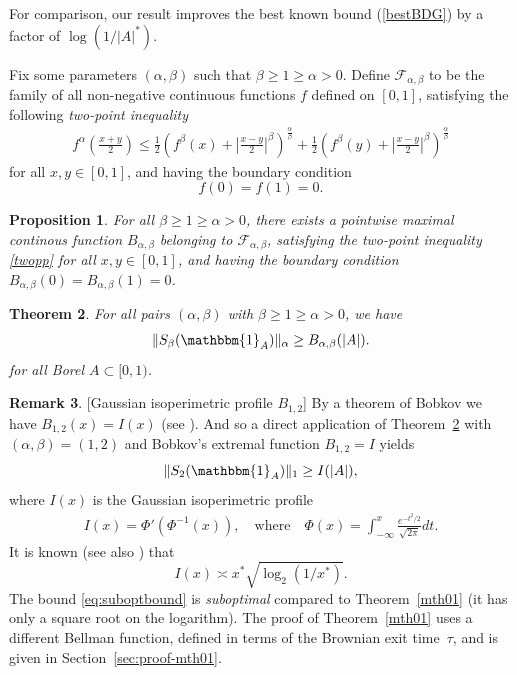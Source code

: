 \documentclass[11pt]{amsart}
\newtheorem{theorem}{Theorem}[section]
\newtheorem{proposition}[theorem]{Proposition}
\theoremstyle{definition}
\newtheorem{remark}[theorem]{Remark}
\renewcommand{\1}{{\mathbbm{1}}}
\begin{document}
For comparison, our result improves the best known bound (\ref{bestBDG}) by a factor of $\log(1/|A|^*)$. 

\vskip0.5cm 

Fix some parameters $(\alpha, \beta)$ such that $\beta \geq 1 \geq \alpha >0$. Define $\mathcal{F}_{\alpha,\beta}$ to be the family of all non-negative continuous functions $f$ defined on $[0,1]$, satisfying the following {\em two-point inequality} 
\begin{align}\label{twopp}
f^{\alpha}\left(\frac{x+y}{2}\right) \leq \frac{1}{2} \left(f^{\beta}(x)+\left|\frac{x-y}{2}\right|^{\beta}\right)^{\frac{\alpha}{\beta}}+\frac{1}{2} \left(f^{\beta}(y)+\left|\frac{x-y}{2}\right|^{\beta}\right)^{\frac{\alpha}{\beta}}
\end{align}
for all $x,y \in [0,1]$, and having the boundary condition
$$
f(0)=f(1)=0.
$$

\begin{proposition}\label{twopp-max-func}
For all $\beta \geq 1 \geq \alpha >0$, there exists a pointwise maximal {continous} function $ B_{\alpha, \beta}$ belonging to $\mathcal{F}_{\alpha,\beta}$, satisfying
the {\em two-point inequality} \eqref{twopp}
for all $x,y \in [0,1]$, and having the boundary condition  $B_{\alpha, \beta}(0)=B_{\alpha, \beta}(1)=0$.
\end{proposition}

\begin{theorem} \label{mthgenab}
For all pairs $(\alpha, \beta)$ with $\beta \geq 1\geq \alpha >0$, we have
\begin{align}\label{genab}
\| S_{\beta}(\mathbbm{1}_{A})\|_{\alpha} \geq B_{\alpha,\beta}(|A|). 
\end{align}
for all Borel $A \subset {[0,1)}$.
\end{theorem}

\begin{remark}\label{remb1}[Gaussian isoperimetric profile $B_{1,2}$]
By a theorem of Bobkov we have $B_{1,2}(x)=I(x)$ (see \cite{bobk1}). 
And so a direct application of Theorem~\ref{mthgenab} with $(\alpha,\beta)=(1,2)$ and Bobkov's extremal function $B_{1,2}=I$ yields
\begin{equation}
\label{eq:suboptbound}
    \|S_{2}(\mathbbm{1}_{A})\|_{1} \geq I(|A|),
\end{equation}
where $I(x)$ is the Gaussian isoperimetric profile
\begin{align*}
I(x)=\Phi'(\Phi^{-1}(x)), \quad \text{where} \quad \Phi(x)=\int_{-\infty}^{x}\frac{e^{-t^{2}/2}}{\sqrt{2\pi}}dt.
\end{align*}
It is known (see also \cite{bobk1}) that 
\[
I(x) \asymp x^{*} \sqrt{\log_{2}(1/x^{*})}.
\]
The bound \eqref{eq:suboptbound} is \emph{suboptimal} compared to Theorem~\ref{mth01} (it has only a square root on the logarithm). The proof of Theorem~\ref{mth01} uses a different Bellman function, defined in terms of the Brownian exit time~$\tau$, and is given in Section~\ref{sec:proof-mth01}.
\end{remark}
\end{document}
